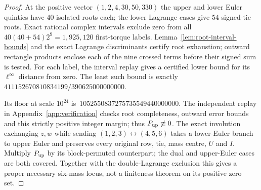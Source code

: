 \documentclass[11pt]{amsart}
\theoremstyle{remark}
\newcommand{\Needspace}[1]{\par\ifdim\dimexpr\pagegoal-\pagetotal\relax<#1\newpage\fi}
\begin{document}
\begin{proof}
At the positive vector $(1,2,4,30,50,330)$ the upper and lower Euler quintics have 40 isolated roots each; the lower Lagrange cases give 54 signed-tie roots. Exact rational complex intervals exclude zero from all $40(40+54)2^9=1{,}925{,}120$ first-torque labels. Lemma~\ref{lem:root-interval-bounds} and the exact Lagrange discriminants certify root exhaustion; outward rectangle products enclose each of the nine crossed terms before their signed sum is tested. For each label, the interval replay gives a certified lower bound for its $\ell^\infty$ distance from zero. The least such bound is exactly $411152670810834199/390625000000000$. \Needspace{2\baselineskip}Its floor at scale $10^{24}$ is~$1052550837275735549440000000$. The independent replay in Appendix~\ref{app:verification} checks root completeness, outward error bounds and this strictly positive integer margin; thus $P_{\rm up}\not\equiv0$. The exact involution exchanging $z,w$ while sending $(1,2,3)\leftrightarrow(4,5,6)$ takes a lower-Euler branch to upper Euler and preserves every original row, tie, mass centre, $U$ and $I$. Multiply $P_{\rm up}$ by its block-permuted counterpart; the dual and upper-Euler cases are both covered. Together with the double-Lagrange exclusion this gives a proper necessary six-mass locus, not a finiteness theorem on its positive zero set.
\end{proof}
\end{document}

